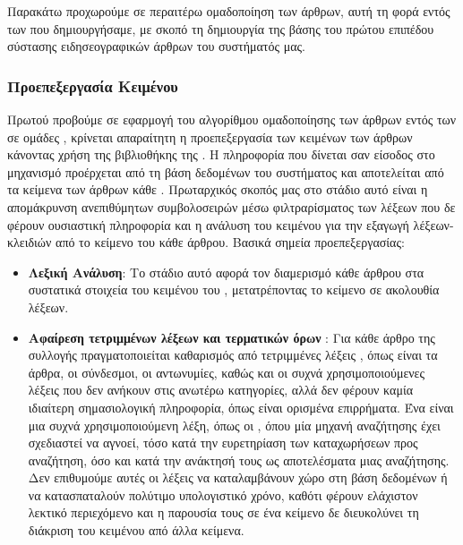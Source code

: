 {{{{{{Παρακάτω προχωρούμε σε περαιτέρω ομαδοποίηση των άρθρων, αυτή τη φορά εντός των {} που δημιουργήσαμε, 
με σκοπό τη δημιουργία της βάσης του πρώτου επιπέδου σύστασης ειδησεογραφικών άρθρων του συστήματός μας. 

\subsubsection{Προεπεξεργασία Κειμένου {}}

Πρωτού προβούμε σε εφαρμογή του αλγορίθμου ομαδοποίησης των άρθρων εντός των  {} σε ομάδες {}, 
κρίνεται απαραίτητη η προεπεξεργασία των κειμένων των άρθρων κάνοντας χρήση της βιβλιοθήκης {} της {}. 
Η πληροφορία που δίνεται σαν είσοδος στο μηχανισμό προέρχεται από τη βάση δεδομένων του συστήματος 
και αποτελείται από τα κείμενα των άρθρων κάθε {}. 
Πρωταρχικός σκοπός μας στο στάδιο αυτό είναι η απομάκρυνση ανεπιθύμητων συμβολοσειρών μέσω φιλτραρίσματος των λέξεων 
που δε φέρουν ουσιαστική πληροφορία και η ανάλυση του κειμένου για την εξαγωγή λέξεων-κλειδιών από το κείμενο του κάθε άρθρου.
Βασικά σημεία προεπεξεργασίας: 
\begin{itemize}
 \item \textbf{Λεξική Ανάλυση}: Το στάδιο αυτό αφορά τον διαμερισμό κάθε άρθρου στα συστατικά στοιχεία του κειμένου του {}, 
 μετατρέποντας το κείμενο σε ακολουθία λέξεων. 
 \item \textbf{Αφαίρεση τετριμμένων λέξεων και τερματικών όρων {}}: Για κάθε άρθρο της συλλογής πραγματοποιείται καθαρισμός 
 από τετριμμένες λέξεις {}, 
όπως είναι τα άρθρα, οι σύνδεσμοι, οι αντωνυμίες, καθώς και οι συχνά χρησιμοποιούμενες λέξεις 
που δεν ανήκουν στις ανωτέρω κατηγορίες, αλλά δεν φέρουν καμία ιδιαίτερη σημασιολογική πληροφορία, 
όπως είναι ορισμένα επιρρήματα. Ένα {} είναι μια συχνά χρησιμοποιούμενη λέξη, 
όπως οι {}, όπου μία μηχανή αναζήτησης έχει σχεδιαστεί να αγνοεί, 
τόσο κατά την ευρετηρίαση των καταχωρήσεων προς αναζήτηση, όσο και κατά την ανάκτησή τους ως αποτελέσματα μιας αναζήτησης. 
Δεν επιθυμούμε αυτές οι λέξεις να καταλαμβάνουν χώρο στη βάση δεδομένων 
ή να κατασπαταλούν πολύτιμο υπολογιστικό χρόνο, καθότι φέρουν ελάχιστον λεκτικό 
περιεχόμενο και η παρουσία τους σε ένα κείμενο δε διευκολύνει τη διάκριση του κειμένου από άλλα κείμενα. 

\end{itemize}}}}}}}
